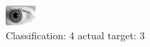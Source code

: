 \begin{figure}[h!]
\begin{center}
\includegraphics[width=0.60\columnwidth]{figures/ID261_class_4_target_3.png}
\end{center}
\caption{ Classification: 4 actual target: 3}
\label{fig:ID261_class_4_target_3}
\end{figure}
